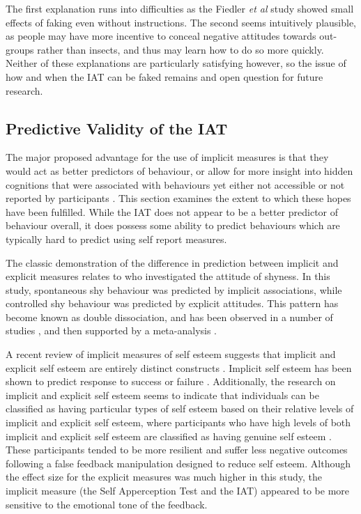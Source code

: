 The first explanation runs into difficulties as the Fiedler \textit{et al}  study showed small effects of faking even without instructions. The second seems intuitively plausible, as people may have more incentive to conceal negative attitudes towards out-groups rather than insects, and thus may learn how to do so more quickly. Neither of these explanations are particularly satisfying however, so the issue of how and when the IAT can be faked remains and open question for future research. 

 
\subsection{Predictive Validity of the IAT}
\label{sec:pred-valid-iat}


The major proposed advantage for the use of implicit measures is that they would act as better predictors of behaviour, or allow for more insight into hidden cognitions that were associated with behaviours yet either not accessible or not reported by participants \cite{Greenwald1998}. This section examines the extent to which these hopes have been fulfilled. While the IAT does not appear to be a better predictor of behaviour overall, it does possess some ability to predict behaviours which are typically hard to predict using self report measures. 

The classic demonstration of the difference in prediction between implicit and explicit measures relates to \cite{Asendorpf2002} who investigated the attitude of shyness. In this study, spontaneous shy behaviour was predicted by implicit associations, while controlled shy behaviour was predicted by explicit attitudes. This pattern has become known as double dissociation, and has been observed in a number of studies \cite{Perugini2005}, and  then supported by  a meta-analysis \cite{Hofmann2005}. 

A recent review of implicit measures of self esteem suggests that implicit and explicit self esteem are entirely distinct constructs \cite{Rudolph2008}. Implicit self esteem has been shown to predict response to success or failure \cite{Greenwald2000}. Additionally, the research on implicit and explicit self esteem seems to indicate that individuals can be classified as having particular types of self esteem based on their relative levels of implicit and explicit self esteem, where participants who have high levels of both implicit and explicit self esteem are classified as having genuine self esteem \cite{Meagher2004}. These participants tended to be more resilient and suffer less negative outcomes following a false feedback manipulation designed to reduce self esteem. Although the effect size for the explicit measures was much higher in this study, the implicit measure (the Self Apperception Test and the IAT) appeared to be more sensitive to the emotional tone of the feedback. 


